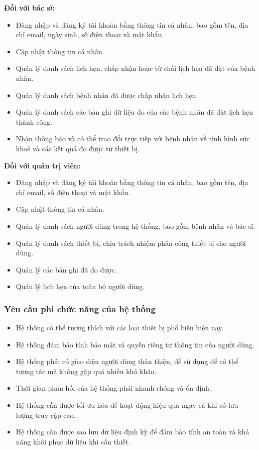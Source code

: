 \textbf{Đối với bác sĩ:}
\begin{adjustwidth}{1.5em}{}
	\begin{itemize}
		\item Đăng nhập và đăng ký tài khoản bằng thông tin cá nhân, bao gồm tên, địa chỉ email, ngày sinh, số điện thoại và mật khẩu.
		\item Cập nhật thông tin cá nhân.
		\item Quản lý danh sách lịch hẹn, chấp nhận hoặc từ chối lịch hẹn đã đặt của bệnh nhân.
		\item Quản lý danh sách bệnh nhân đã được chấp nhận lịch hẹn.
		\item Quản lý danh sách các bản ghi dữ liệu đo của các bệnh nhân đã đặt lịch hẹn thành công.
		\item Nhận thông báo và có thể trao đổi trực tiếp với bệnh nhân về tình hình sức khoẻ và các kết quả đo được từ thiết bị.
	\end{itemize}
\end{adjustwidth}
\textbf{Đối với quản trị viên:}
\begin{adjustwidth}{1.5em}{}
	\begin{itemize}
		\item Đăng nhập và đăng ký tài khoản bằng thông tin cá nhân, bao gồm tên, địa chỉ email, số điện thoại và mật khẩu.
		\item Cập nhật thông tin cá nhân.
		\item Quản lý danh sách người dùng trong hệ thống, bao gồm bệnh nhân và bác sĩ.
		\item Quản lý danh sách thiết bị, chịu trách nhiệm phân công thiết bị cho người dùng.
		\item Quản lý các bản ghi đã đo được.
		\item Quản lý lịch hẹn của toàn bộ người dùng.
	\end{itemize}
\end{adjustwidth}

\subsubsection{Yêu cầu phi chức năng của hệ thống}
\begin{itemize}
	\item Hệ thống có thể tương thích với các loại thiết bị phổ biến hiện nay.
	\item Hệ thống đảm bảo tính bảo mật và quyền riêng tư thông tin của người dùng.
	\item Hệ thống phải có giao diện người dùng thân thiện, dễ sử dụng để có thể tương tác mà không gặp quá nhiều khó khăn.
	\item Thời gian phản hồi của hệ thống phải nhanh chóng và ổn định.
	\item Hệ thống cần được tối ưu hóa để hoạt động hiệu quả ngay cả khi có lưu lượng truy cập cao.
	\item Hệ thống cần được sao lưu dữ liệu định kỳ để đảm bảo tính an toàn và khả năng khôi phục dữ liệu khi cần thiết.
\end{itemize}

